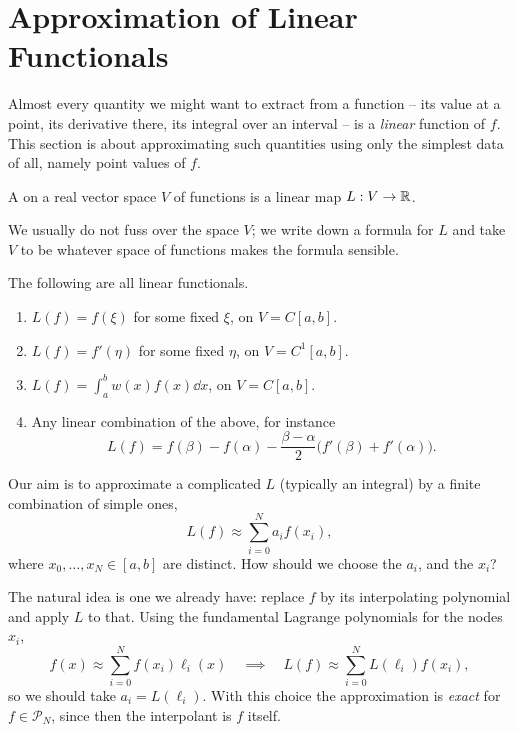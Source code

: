 \documentclass[a4paper]{scrartcl}
\newcommand{\Pn}[1]{\mathcal{P}_{#1}}
\begin{document}
\section{Approximation of Linear Functionals}

Almost every quantity we might want to extract from a function -- its value at a point, its derivative there, its integral over an interval -- is a \emph{linear} function of $f$. This section is about approximating such quantities using only the simplest data of all, namely point values of $f$.

\begin{definition}
  A  on a real vector space $V$ of functions is a linear map $L: V \to \mathbb{R}$.
\end{definition}

We usually do not fuss over the space $V$; we write down a formula for $L$ and take $V$ to be whatever space of functions makes the formula sensible.

\begin{example}
  The following are all linear functionals.
  \begin{enumerate}[label=(\roman*)]
    \item $L(f) = f(\xi)$ for some fixed $\xi$, on $V = C[a,b]$.
    \item $L(f) = f'(\eta)$ for some fixed $\eta$, on $V = C^1[a,b]$.
    \item $L(f) = \int_a^b w(x)f(x)\dd x$, on $V = C[a,b]$.
    \item Any linear combination of the above, for instance
    $$
    L(f) = f(\beta) - f(\alpha) - \frac{\beta - \alpha}{2}\big(f'(\beta) + f'(\alpha)\big).
    $$
  \end{enumerate}
\end{example}

Our aim is to approximate a complicated $L$ (typically an integral) by a finite combination of simple ones,
$$
L(f) \approx \sum_{i=0}^{N} a_i f(x_i),
$$
where $x_0, \dots, x_N \in [a,b]$ are distinct. How should we choose the $a_i$, and the $x_i$?

The natural idea is one we already have: replace $f$ by its interpolating polynomial and apply $L$ to that. Using the fundamental Lagrange polynomials for the nodes $x_i$,
$$
f(x) \approx \sum_{i=0}^N f(x_i)\ell_i(x) \quad \implies \quad L(f) \approx \sum_{i=0}^N L(\ell_i)f(x_i),
$$
so we should take $a_i = L(\ell_i)$. With this choice the approximation is \emph{exact} for $f \in \Pn{N}$, since then the interpolant is $f$ itself.
\end{document}
